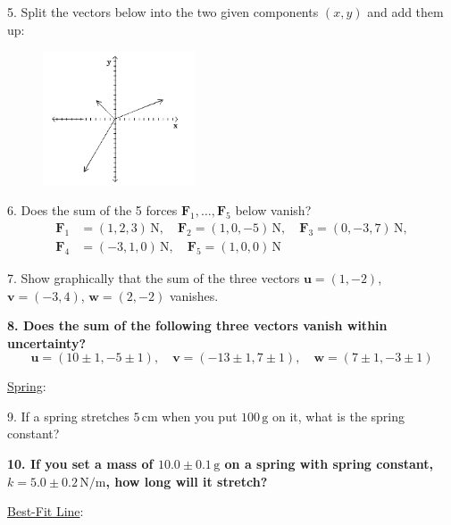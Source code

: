 5. Split the vectors below into the two given components $(x,y)$ and add them up:
\begin{figure}[h]
    \begin{center}
        \includegraphics[width=0.4\textwidth]{./Exp1-4/pic/image5.png}
    \end{center}
\end{figure}

6. Does the sum of the 5 forces $\mathbf{F}_1,\dots,\mathbf{F}_5$ below vanish?
\begin{align*}
    \mathbf{F}_1 &= (1,2,3)\,\mathrm{N},\quad \mathbf{F}_2 = (1,0,-5)\,\mathrm{N},\quad \mathbf{F}_3 = (0,-3,7)\,\mathrm{N}, \\
    \mathbf{F}_4 &= (-3,1,0)\,\mathrm{N},\quad \mathbf{F}_5 = (1,0,0)\,\mathrm{N}
\end{align*}

7. Show graphically that the sum of the three vectors $\mathbf{u} = (1,-2)$, $\mathbf{v} = (-3,4)$, $\mathbf{w} = (2,-2)$ vanishes.\myskip

{\bf{8. Does the sum of the following three vectors vanish within uncertainty?}}
\begin{equation*}
    \mathbf{u} = (10 \pm 1, -5 \pm 1),\quad \mathbf{v} = (-13 \pm 1, 7 \pm 1),\quad \mathbf{w} = (7 \pm 1, -3 \pm 1)
\end{equation*}


\noindent \underline{Spring}:\myskip

9. If a spring stretches $5\,\mathrm{cm}$ when you put $100\,\mathrm{g}$ on it, what is the spring constant? \myskip

{\bf{10. If you set a mass of $10.0 \pm 0.1\,\mathrm{g}$ on a spring with spring constant, $k = 5.0 \pm 0.2 \,\mathrm{N/m}$, how long will it stretch?}} \myskip

\noindent \underline{Best-Fit Line}: \myskip

